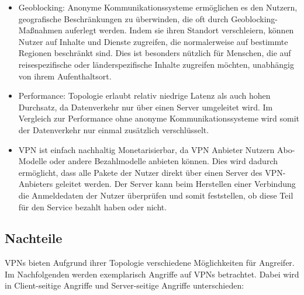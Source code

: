 \begin{itemize}
    \item Geoblocking: Anonyme Kommunikationssysteme ermöglichen es den Nutzern, geografische Beschränkungen zu überwinden, die oft durch Geoblocking-Maßnahmen auferlegt werden. Indem sie ihren Standort verschleiern, können Nutzer auf Inhalte und Dienste zugreifen, die normalerweise auf bestimmte Regionen beschränkt sind. Dies ist besonders nützlich für Menschen, die auf reisespezifische oder länderspezifische Inhalte zugreifen möchten, unabhängig von ihrem Aufenthaltsort.
    \item Performance: Topologie erlaubt relativ niedrige Latenz als auch hohen Durchsatz, da Datenverkehr nur über einen Server umgeleitet wird. Im Vergleich zur Performance ohne anonyme Kommunikationssysteme wird somit der Datenverkehr nur einmal zusätzlich verschlüsselt.
    \item VPN ist einfach nachhaltig Monetarisierbar, da VPN Anbieter Nutzern Abo-Modelle oder andere Bezahlmodelle anbieten können. Dies wird dadurch ermöglicht, dass alle Pakete der Nutzer direkt über einen Server des VPN-Anbieters geleitet werden. Der Server kann beim Herstellen einer Verbindung die Anmeldedaten der Nutzer überprüfen und somit feststellen, ob diese Teil für den Service bezahlt haben oder nicht.
\end{itemize}

\subsection{Nachteile}
\label{chap:vpn_disadvantages}

VPNs bieten Aufgrund ihrer Topologie verschiedene Möglichkeiten für Angreifer. Im Nachfolgenden werden exemplarisch Angriffe auf VPNs betrachtet. Dabei wird in Client-seitige Angriffe und Server-seitige Angriffe unterschieden:

